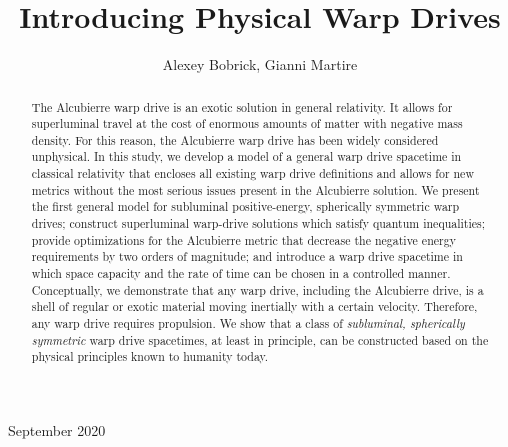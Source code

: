 \documentclass[10pt]{iopart}
\begin{document}
\title{Introducing Physical Warp Drives}

\author{Alexey Bobrick, Gianni Martire}

\address{Advanced Propulsion Laboratory at Applied Physics, 477 Madison Avenue, New York, 10022, U.S.}
\vspace{10pt}
\begin{indented}
\item[]September 2020
\end{indented}

\begin{abstract} 
The Alcubierre warp drive is an exotic solution in general relativity. It allows for superluminal travel at the cost of enormous amounts of matter with negative mass density. For this reason, the Alcubierre warp drive has been widely considered unphysical. In this study, we develop a model of a general warp drive spacetime in classical relativity that encloses all existing warp drive definitions and allows for new metrics without the most serious issues present in the Alcubierre solution. We present the first general model for subluminal positive-energy, spherically symmetric warp drives; construct superluminal warp-drive solutions which satisfy quantum inequalities; provide optimizations for the Alcubierre metric that decrease the negative energy requirements by two orders of magnitude; and introduce a warp drive spacetime in which space capacity and the rate of time can be chosen in a controlled manner. Conceptually, we demonstrate that any warp drive, including the Alcubierre drive, is a shell of regular or exotic material moving inertially with a certain velocity. Therefore, any warp drive requires propulsion. We show that a class of {\it subluminal, spherically symmetric} warp drive spacetimes, at least in principle, can be constructed based on the physical principles known to humanity today.

\end{abstract}

%

%
\submitto{\CQG}
%
% 
%
\end{document}
